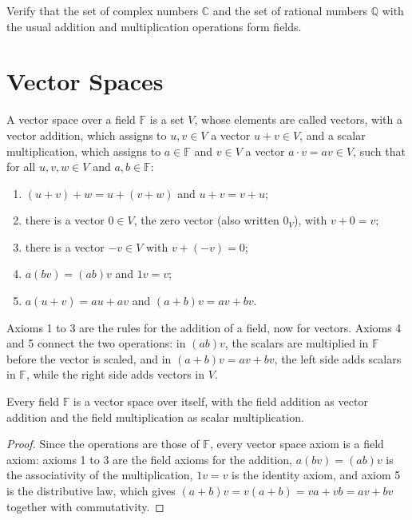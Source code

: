 \begin{exercise}
    Verify that the set of complex numbers $\mathbb{C}$ and the set of rational numbers $\mathbb{Q}$ with the usual addition and multiplication operations form fields.
\end{exercise}

\section{Vector Spaces}

\begin{definition}\label{L1-def:vector-space}
    A vector space over a field $\mathbb{F}$ is a set $V$, whose elements are called vectors, with a vector addition, which assigns to $u, v \in V$ a vector $u + v \in V$, and a scalar multiplication, which assigns to $a \in \mathbb{F}$ and $v \in V$ a vector $a \cdot v = av \in V$, such that for all $u, v, w \in V$ and $a, b \in \mathbb{F}$:
    \begin{enumerate}
        \item $(u + v) + w = u + (v + w)$ and $u + v = v + u$;
        \item there is a vector $0 \in V$, the zero vector (also written $0_V$), with $v + 0 = v$;
        \item there is a vector $-v \in V$ with $v + (-v) = 0$;
        \item $a(bv) = (ab)v$ and $1v = v$;
        \item $a(u + v) = au + av$ and $(a + b)v = av + bv$.
    \end{enumerate}
\end{definition}

Axioms 1 to 3 are the rules for the addition of a field, now for vectors. Axioms 4 and 5 connect the two operations: in $(ab)v$, the scalars are multiplied in $\mathbb{F}$ before the vector is scaled, and in $(a + b)v = av + bv$, the left side adds scalars in $\mathbb{F}$, while the right side adds vectors in $V$.

\begin{example}
    Every field $\mathbb{F}$ is a vector space over itself, with the field addition as vector addition and the field multiplication as scalar multiplication.
\end{example}

\begin{proof}
    Since the operations are those of $\mathbb{F}$, every vector space axiom is a field axiom: axioms 1 to 3 are the field axioms for the addition, $a(bv) = (ab)v$ is the associativity of the multiplication, $1v = v$ is the identity axiom, and axiom 5 is the distributive law, which gives $(a + b)v = v(a + b) = va + vb = av + bv$ together with commutativity.
\end{proof}

